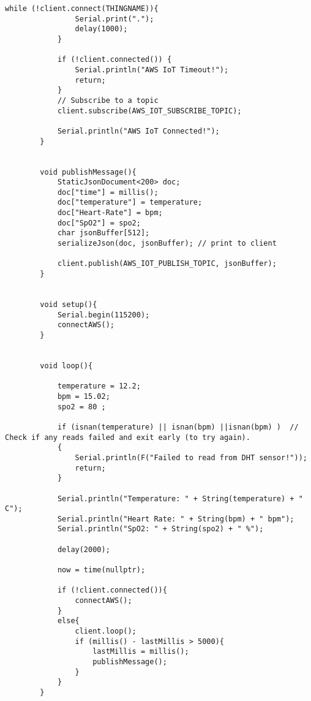 \begin{flushleft}
\begin{lstlisting}[style=CStyle]
			while (!client.connect(THINGNAME)){
				Serial.print(".");
				delay(1000);
			}
			
			if (!client.connected()) {
				Serial.println("AWS IoT Timeout!");
				return;
			}
			// Subscribe to a topic
			client.subscribe(AWS_IOT_SUBSCRIBE_TOPIC);
			
			Serial.println("AWS IoT Connected!");
		}
		
		
		void publishMessage(){
			StaticJsonDocument<200> doc;
			doc["time"] = millis();
			doc["temperature"] = temperature;
			doc["Heart-Rate"] = bpm;
			doc["SpO2"] = spo2;
			char jsonBuffer[512];
			serializeJson(doc, jsonBuffer); // print to client
			
			client.publish(AWS_IOT_PUBLISH_TOPIC, jsonBuffer);
		}
		
		
		void setup(){
			Serial.begin(115200);
			connectAWS();
		}
		
		
		void loop(){
			
			temperature = 12.2;
			bpm = 15.02;
			spo2 = 80 ;
			
			if (isnan(temperature) || isnan(bpm) ||isnan(bpm) )  // Check if any reads failed and exit early (to try again).
			{
				Serial.println(F("Failed to read from DHT sensor!"));
				return;
			}
			
			Serial.println("Temperature: " + String(temperature) + " C");
			Serial.println("Heart Rate: " + String(bpm) + " bpm");
			Serial.println("SpO2: " + String(spo2) + " %");
			
			delay(2000);
			
			now = time(nullptr);
			
			if (!client.connected()){
				connectAWS();
			}
			else{
				client.loop();
				if (millis() - lastMillis > 5000){
					lastMillis = millis();
					publishMessage();
				}
			}
		}
		
	\end{lstlisting}
\end{flushleft}
